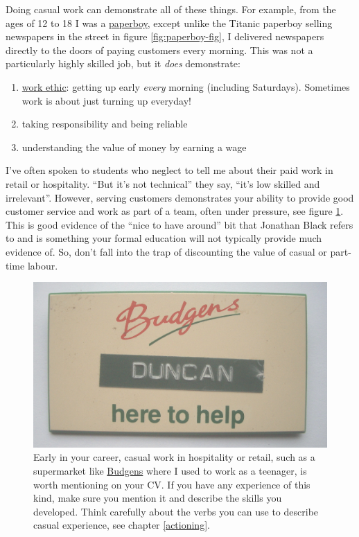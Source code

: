 \documentclass[
]{book}
\providecommand{\tightlist}{%
  \setlength{\itemsep}{0pt}\setlength{\parskip}{0pt}}
\begin{document}
Doing casual work can demonstrate all of these things. For example, from the ages of 12 to 18 I was a \href{https://en.wikipedia.org/wiki/Paperboy}{paperboy}, except unlike the Titanic paperboy selling newspapers in the street in figure \ref{fig:paperboy-fig}, I delivered newspapers directly to the doors of paying customers every morning. This was not a particularly highly skilled job, but it \emph{does} demonstrate:

\begin{enumerate}
\def\labelenumi{\arabic{enumi}.}
\tightlist
\item
  \href{https://en.wikipedia.org/wiki/Work_ethic}{work ethic}: getting up early \emph{every} morning (including Saturdays). Sometimes work is about just turning up everyday!
\item
  taking responsibility and being reliable
\item
  understanding the value of money by earning a wage
\end{enumerate}

I've often spoken to students who neglect to tell me about their paid work in retail or hospitality. ``But it's not technical'' they say, ``it's low skilled and irrelevant''. However, serving customers demonstrates your ability to provide good customer service and work as part of a team, often under pressure, see figure \ref{fig:budgens-fig}. This is good evidence of the ``nice to have around'' bit that Jonathan Black refers to \citep{topnotchcv} and is something your formal education will not typically provide much evidence of. So, don't fall into the trap of discounting the value of casual or part-time labour.

\begin{figure}

{\centering \includegraphics[width=1\linewidth]{images/budgens} 

}

\caption{Early in your career, casual work in hospitality or retail, such as a supermarket like \href{https://en.wikipedia.org/wiki/Budgens}{Budgens} where I used to work as a teenager, is worth mentioning on your CV. If you have any experience of this kind, make sure you mention it and describe the skills you developed. Think carefully about the verbs you can use to describe casual experience, see chapter \ref{actioning}.}\label{fig:budgens-fig}
\end{figure}
\end{document}
